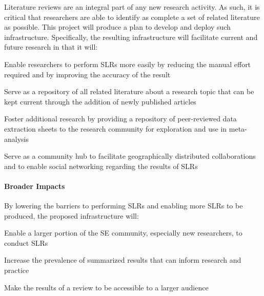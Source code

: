 Literature reviews are an integral part of any new research activity. As such, it is critical that researchers are able to identify as complete a set of related literature as possible. This project will produce a plan to develop and deploy such infrastructure. Specifically, the resulting infrastructure will facilitate current and future research %
in that it will:
\vspace*{-4pt}
\begin{itemize*}
\item Enable researchers to perform SLRs more easily by reducing the manual effort required and by improving the accuracy of the result
\item Serve as a repository of all related literature about a research topic that can be kept current through the addition of newly published articles
\item Foster additional research by providing a repository of peer-reviewed data extraction sheets to the research community for exploration and use in meta-analysis
\item Serve as a community hub to facilitate geographically distributed collaborations and to enable social networking regarding the results of SLRs
\end{itemize*}
\vspace*{-4pt}

\paragraph{Broader Impacts}

By lowering the barriers to performing SLRs and enabling more SLRs to be produced, the proposed infrastructure will: %
\vspace*{-4pt}
\begin{itemize*}
\item Enable a larger portion of the SE community, especially new researchers, to conduct SLRs
\item Increase the prevalence of summarized results that can inform research and practice
\item Make the results of a review to be accessible to a larger audience

\end{itemize*}
\vspace*{-4pt}

